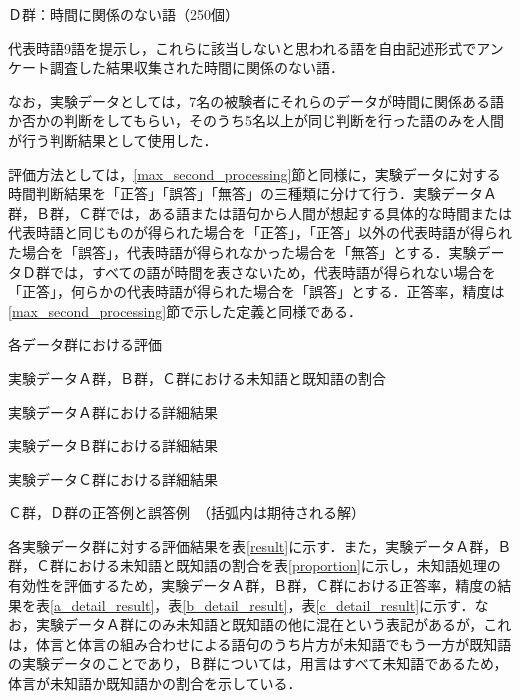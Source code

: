 Ｄ群：時間に関係のない語（250個）

代表時語9語を提示し，これらに該当しないと思われる語を自由記述形式でアンケート調査した結果収集された時間に関係のない語．


なお，実験データとしては，7名の被験者にそれらのデータが時間に関係ある語か否かの判断をしてもらい，そのうち5名以上が同じ判断を行った語のみを人間が行う判断結果として使用した．

評価方法としては，\ref{max_second_processing}節と同様に，実験データに対する時間判断結果を「正答」「誤答」「無答」の三種類に分けて行う．実験データＡ群，Ｂ群，Ｃ群では，ある語または語句から人間が想起する具体的な時間または代表時語と同じものが得られた場合を「正答」，「正答」以外の代表時語が得られた場合を「誤答」，代表時語が得られなかった場合を「無答」とする．実験データＤ群では，すべての語が時間を表さないため，代表時語が得られない場合を「正答」，何らかの代表時語が得られた場合を「誤答」とする．正答率，精度は\ref{max_second_processing}節で示した定義と同様である．

\begin{table}[b]
\caption{各データ群における評価}
\label{result}
\end{table}

\begin{table}[b]
\caption{実験データＡ群，Ｂ群，Ｃ群における未知語と既知語の割合}
\label{proportion}
\end{table}

\begin{table}[t]
\caption{実験データＡ群における詳細結果}
\label{a_detail_result}
\end{table}

\begin{table}[t]
\caption{実験データＢ群における詳細結果}
\label{b_detail_result}
\end{table}

\begin{table}[t]
\caption{実験データＣ群における詳細結果}
\label{c_detail_result}
\end{table}

\begin{table}[b]
\caption{Ｃ群，Ｄ群の正答例と誤答例　（括弧内は期待される解）}
\label{C_D_result_conf}
\end{table}

各実験データ群に対する評価結果を表\ref{result}に示す．また，実験データＡ群，Ｂ群，Ｃ群における未知語と既知語の割合を表\ref{proportion}に示し，未知語処理の有効性を評価するため，実験データＡ群，Ｂ群，Ｃ群における正答率，精度の結果を表\ref{a_detail_result}，表\ref{b_detail_result}，表\ref{c_detail_result}に示す．なお，実験データＡ群にのみ未知語と既知語の他に混在という表記があるが，これは，体言と体言の組み合わせによる語句のうち片方が未知語でもう一方が既知語の実験データのことであり，Ｂ群については，用言はすべて未知語であるため，体言が未知語か既知語かの割合を示している．

